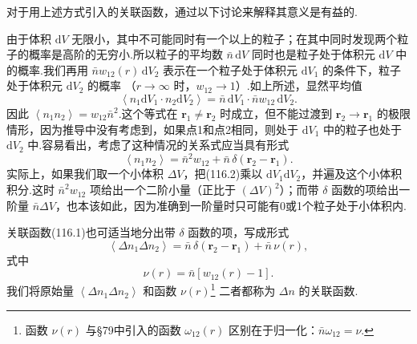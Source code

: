 对于用上述方式引入的关联函数，通过以下讨论来解释其意义是有益的.

由于体积 $\mathrm{d}V$ 无限小，其中不可能同时有一个以上的粒子；在其中同时发现两个粒子的概率是高阶的无穷小.所以粒子的平均数 $\bar{n}\,\mathrm{d}V$ 同时也是粒子处于体积元
$\mathrm{d}V$ 中的概率.我们再用 $\bar{n}w_{12}(r)\,\mathrm{d}V_{2}$ 表示在一个粒子处于体积元 $\mathrm{d}V_{1}$ 的条件下，粒子处于体积元 $\mathrm{d}V_{2}$ 的概率
（$r\to\infty$ 时，$w_{12}\to1$）.如上所述，显然平均值
\begin{equation*}
  \left\langle n_{1}\mathrm{d}V_{1}\cdot n_{2}\mathrm{d}V_{2}\right\rangle
  =\bar{n}\,\mathrm{d}V_{1}\cdot\bar{n}w_{12}\,\mathrm{d}V_{2}.
\end{equation*}
因此 $\left\langle n_{1}n_{2}\right\rangle=w_{12}\bar{n}^{2}$.这个等式在
$\boldsymbol{r}_{1}\neq\boldsymbol{r}_{2}$ 时成立，但不能过渡到
$\boldsymbol{r}_{2}\to\boldsymbol{r}_{1}$ 的极限情形，因为推导中没有考虑到，如果点1和点2相同，则处于 $\mathrm{d}V_{1}$ 中的粒子也处于 $\mathrm{d}V_{2}$ 中.容易看出，考虑了这种情况的关系式应当具有形式
\begin{equation}
  \left\langle n_{1}n_{2}\right\rangle
  =\bar{n}^{2}w_{12}+\bar{n}\,\delta(\boldsymbol{r}_{2}-\boldsymbol{r}_{1}).
\end{equation}
实际上，如果我们取一个小体积 $\Delta V$，把(116.2)乘以 $\mathrm{d}V_{1}\mathrm{d}V_{2}$，并遍及这个小体积积分.这时 $\bar{n}^{2}w_{12}$ 项给出一个二阶小量（正比于
$(\Delta V)^{2}$）；而带 $\delta$ 函数的项给出一阶量 $\bar{n}\Delta V$，也本该如此，因为准确到一阶量时只可能有0或1个粒子处于小体积内.

关联函数(116.1)也可适当地分出带 $\delta$ 函数的项，写成形式
\begin{equation}
  \left\langle\Delta n_{1}\Delta n_{2}\right\rangle
  =\bar{n}\,\delta(\boldsymbol{r}_{2}-\boldsymbol{r}_{1})+\bar{n}\,\nu(r),
\end{equation}
式中
\begin{equation}
  \nu(r)=\bar{n}\left[w_{12}(r)-1\right].
\end{equation}
我们将原始量 $\left\langle\Delta n_{1}\Delta n_{2}\right\rangle$ 和函数 $\nu(r)$\footnote{函数 $\nu(r)$ 与§79中引入的函数 $\omega_{12}(r)$ 区别在于归一化：$\bar{n}\omega_{12}=\nu$.}
二者都称为 $\Delta n$ 的关联函数.

